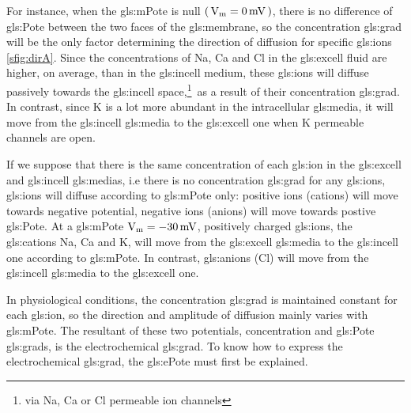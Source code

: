 \documentclass[class={myRUCProject}, crop=false]{standalone}
\begin{document}
For instance, when the \gls{gls:mPote} is null \(\br{\unit{\V\membrane}=\qty{0}{\mV}}\), there is no difference of \gls{gls:Pote} between the two faces of the \gls{gls:membrane}, so the concentration \gls{gls:grad} will be the only factor determining the direction of diffusion for specific \glspl{gls:ion} \cref{sfig:dirA}. 
Since the concentrations of \gls{Na}, \gls{Ca} and \gls{Cl} in the \gls{gls:excell} fluid are higher, on average, than in the \gls{gls:incell} medium, these \glspl{gls:ion} will diffuse passively towards the \gls{gls:incell} space,\footnote{via \gls{Na}, \gls{Ca} or \gls{Cl} permeable ion channels}~as a result of their concentration \gls{gls:grad}. In contrast, since \gls{K} is a lot more abundant in the intracellular \gls{gls:media}, it will move from the \gls{gls:incell} \gls{gls:media} to the \gls{gls:excell} one when \gls{K} permeable channels are open. 

If we suppose that there is the same concentration of each \gls{gls:ion} in the \gls{gls:excell} and \gls{gls:incell} \glspl{gls:media}, i.e there is no concentration \gls{gls:grad} for any \glspl{gls:ion}, \glspl{gls:ion} will diffuse according to \gls{gls:mPote} only: positive ions (cations) will move towards negative potential, negative ions (anions) will move towards postive \gls{gls:Pote}. At a \gls{gls:mPote} \(\unit{\V\membrane}=\qty{-30}{\mV}\), positively charged \glspl{gls:ion}, the \glspl{gls:cation} \gls{Na}, \gls{Ca} and \gls{K}, will move from the \gls{gls:excell} \gls{gls:media} to the \gls{gls:incell} one according to \gls{gls:mPote}. In contrast, \glspl{gls:anion} (\gls{Cl}) will move from the \gls{gls:incell} \gls{gls:media} to the \gls{gls:excell} one. 

In physiological conditions, the concentration \gls{gls:grad} is maintained constant for each \gls{gls:ion}, so the direction and amplitude of diffusion mainly varies with \gls{gls:mPote}. 
The resultant of these two potentials, concentration and \gls{gls:Pote} \glspl{gls:grad}, is the electrochemical \gls{gls:grad}. To know how to express the electrochemical \gls{gls:grad}, the \gls{gls:ePote} must first be explained.
 
\end{document}
